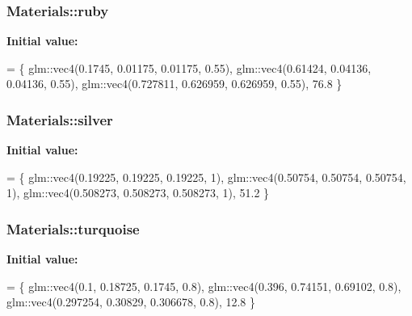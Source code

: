 \subsubsection[{\texorpdfstring{ruby}{ruby}}]{ Materials\+::ruby}\hypertarget{namespace_materials_a0440cdfea64816f17c8616a5bbf626e2}{}\label{namespace_materials_a0440cdfea64816f17c8616a5bbf626e2}
{\bfseries Initial value\+:}
\begin{DoxyCode}
= \{
        glm::vec4(0.1745, 0.01175, 0.01175, 0.55),
        glm::vec4(0.61424, 0.04136, 0.04136, 0.55),
        glm::vec4(0.727811, 0.626959, 0.626959, 0.55),
        76.8
    \}
\end{DoxyCode}
\subsubsection[{\texorpdfstring{silver}{silver}}]{ Materials\+::silver}\hypertarget{namespace_materials_a566238bc6d1fe2f5e8a78e2031b8eb09}{}\label{namespace_materials_a566238bc6d1fe2f5e8a78e2031b8eb09}
{\bfseries Initial value\+:}
\begin{DoxyCode}
= \{
        glm::vec4(0.19225, 0.19225, 0.19225, 1),
        glm::vec4(0.50754, 0.50754, 0.50754, 1),
        glm::vec4(0.508273, 0.508273, 0.508273, 1),
        51.2
    \}
\end{DoxyCode}
\subsubsection[{\texorpdfstring{turquoise}{turquoise}}]{ Materials\+::turquoise}\hypertarget{namespace_materials_ab5b494a26565e795963d6b448cb62516}{}\label{namespace_materials_ab5b494a26565e795963d6b448cb62516}
{\bfseries Initial value\+:}
\begin{DoxyCode}
= \{
        glm::vec4(0.1, 0.18725, 0.1745, 0.8),
        glm::vec4(0.396, 0.74151, 0.69102, 0.8),
        glm::vec4(0.297254, 0.30829, 0.306678, 0.8),
        12.8
    \}
\end{DoxyCode}
